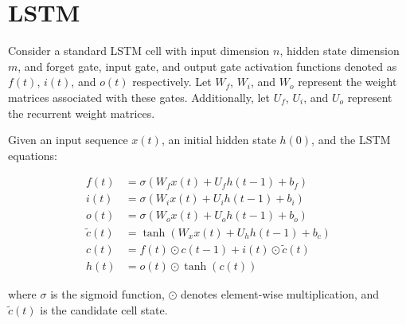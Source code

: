 \section{LSTM}

Consider a standard LSTM cell with input dimension $n$, hidden state dimension $m$, and forget gate, input gate, and output gate activation functions denoted as $f(t)$, $i(t)$, and $o(t)$ respectively. Let $W_f$, $W_i$, and $W_o$ represent the weight matrices associated with these gates. Additionally, let $U_f$, $U_i$, and $U_o$ represent the recurrent weight matrices.

Given an input sequence $x(t)$, an initial hidden state $h(0)$, and the LSTM equations:

\begin{align*}
f(t) &= \sigma(W_f x(t) + U_f h(t-1) + b_f) \\
i(t) &= \sigma(W_i x(t) + U_i h(t-1) + b_i) \\
o(t) &= \sigma(W_o x(t) + U_o h(t-1) + b_o) \\
\tilde{c}(t) &= \tanh(W_x x(t) + U_h h(t-1) + b_c) \\
c(t) &= f(t) \odot c(t-1) + i(t) \odot \tilde{c}(t) \\
h(t) &= o(t) \odot \tanh(c(t))
\end{align*}

where $\sigma$ is the sigmoid function, $\odot$ denotes element-wise multiplication, and $\tilde{c}(t)$ is the candidate cell state.

